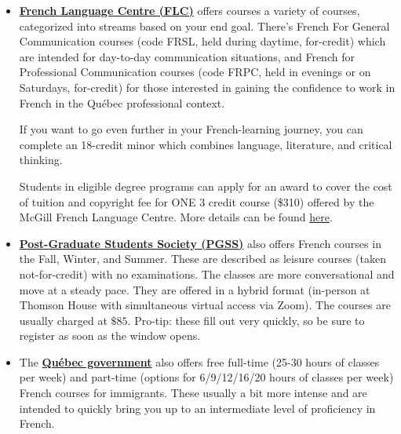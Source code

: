 \begin{itemize}[leftmargin=10pt]
    \item \href{https://www.mcgill.ca/flc/courses-and-programs}{\textbf{French Language Centre (FLC)}} offers courses a variety of courses, categorized into streams based on your end goal. There's French For General Communication courses (code FRSL, held during daytime, for-credit) which are intended for day-to-day communication situations, and French for Professional Communication courses (code FRPC, held in evenings or on Saturdays, for-credit) for those interested in gaining the confidence to work in French in the Qu\'ebec professional context. \vspace{5pt}    
    
    If you want to go even further in your French-learning journey, you can complete an 18-credit minor which combines language, literature, and critical thinking.\vspace{5pt}    
    
    Students in eligible degree programs can apply for an award to cover the cost of tuition and copyright fee for ONE 3 credit course (\$310) offered by the McGill French Language Centre. More details can be found \href{https://www.mcgill.ca/skillsets/files/skillsets/gps_award_for_french_classes.pdf}{here}.\\

    \item \href{https://pgss.mcgill.ca/en/courses}{\textbf{Post-Graduate Students Society (PGSS)}} also offers French courses in the Fall, Winter, and Summer. These are described as leisure courses (taken not-for-credit) with no examinations. The classes are more conversational and move at a steady pace. They are offered in a hybrid format (in-person at Thomson House with simultaneous virtual access via Zoom). The courses are usually charged at $\$85$. Pro-tip: these fill out very quickly, so be sure to register as soon as the window opens. \\

    \item The \href{https://www.quebec.ca/en/education/learn-french}{\textbf{Qu\'ebec government}} also offers free full-time (25-30 hours of classes per week) and part-time (options for 6/9/12/16/20 hours of classes per week) French courses for immigrants. These usually a bit more intense and are intended to quickly bring you up to an intermediate level of proficiency in French. \\


\end{itemize}
